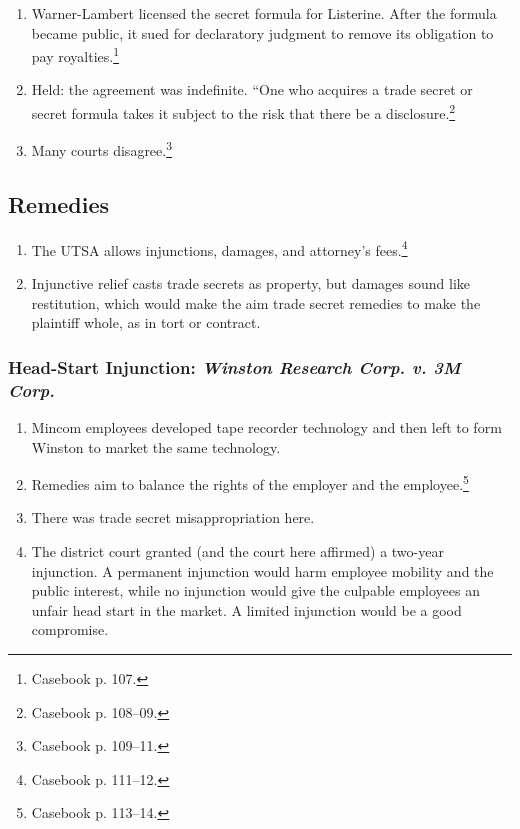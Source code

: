 \begin{enumerate}
    \item Warner-Lambert licensed the secret formula for Listerine. After the 
    formula became public, it sued for declaratory judgment to remove its 
    obligation to pay royalties.\footnote{Casebook p. 107.}
    \item Held: the agreement was indefinite. ``One who acquires a trade 
    secret or secret formula takes it subject to the risk that there be a 
    disclosure.\footnote{Casebook p. 108--09.}
    \item Many courts disagree.\footnote{Casebook p. 109--11.}
\end{enumerate}

\subsection{Remedies}

\begin{enumerate}
    \item The UTSA allows injunctions, damages, and attorney's 
    fees.\footnote{Casebook p. 111--12.}
    \item Injunctive relief casts trade secrets as property, but damages sound 
    like restitution, which would make the aim trade secret remedies to make 
    the plaintiff whole, as in tort or contract.
\end{enumerate}

\subsubsection{Head-Start Injunction: \emph{Winston Research Corp. v. 3M Corp.}}

\begin{enumerate}
    \item Mincom employees developed tape recorder technology and then left to 
    form Winston to market the same technology.
    \item Remedies aim to balance the rights of the employer and the 
    employee.\footnote{Casebook p. 113--14.}
    \item There was trade secret misappropriation here.
    \item The district court granted (and the court here affirmed) a two-year 
    injunction. A permanent injunction would harm employee mobility and the 
    public interest, while no injunction would give the culpable employees an 
    unfair head start in the market. A limited injunction would be a good 
    compromise.
\end{enumerate}
